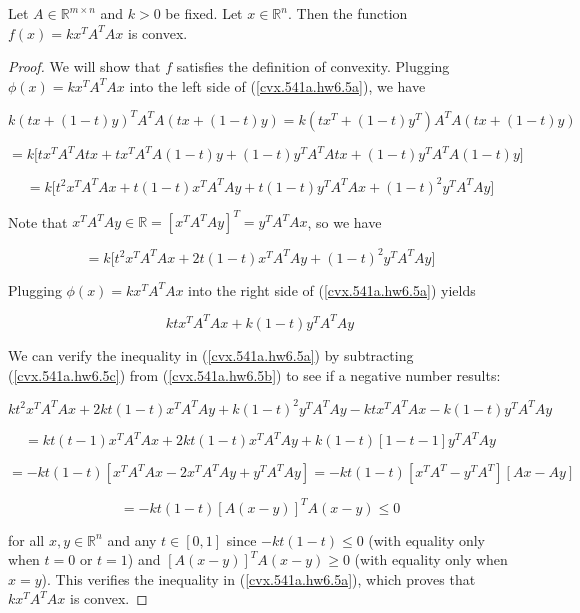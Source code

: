 \begin{proposition}\label{cvs.quad.form.cvx} Let $A \in \mathbb{R}^{m \times n}$ and \(k > 0\) be fixed. Let \(x \in \mathbb{R}^n\). Then the function  \( f(x) = k x^TA^TAx\) is convex.

\end{proposition}

\begin{proof}

We will show that \(f\) satisfies the definition of convexity. Plugging \( \phi(x) = k x^TA^TAx\) into the left side of (\ref{cvx.541a.hw6.5a}), we have

\[
k(tx+(1-t)y)^T A^TA(tx+(1-t)y)  = k(tx^T+(1-t)y^T) A^TA(tx+(1-t)y) 
\]

\[
= k \big[ tx^T A^TA tx + tx^T A^TA  (1-t)y +   (1-t)y^T A^TAtx + (1-t)y^T A^TA(1-t)y  \big]
\]

\[
= k \big[ t^2x^T A^TA x + t(1-t)x^T A^TA  y +   t(1-t)y^T A^TAx + (1-t)^2y^T A^TAy  \big]
\]

Note that \(x^T A^TA  y \in \mathbb{R} = [x^T A^TA  y ]^T = y^T A^TAx\), so we have

\begin{equation}\label{cvx.541a.hw6.5b}
= k \big[ t^2x^T A^TA x + 2t(1-t)x^T A^TA  y  + (1-t)^2y^T A^TAy  \big]
\end{equation}

Plugging \( \phi(x) = k x^TA^TAx\) into the right side of (\ref{cvx.541a.hw6.5a}) yields

\begin{equation}\label{cvx.541a.hw6.5c}
 k t  x^TA^TAx +k(1-t)  y^TA^TAy
\end{equation}

We can verify the inequality in (\ref{cvx.541a.hw6.5a}) by subtracting (\ref{cvx.541a.hw6.5c}) from (\ref{cvx.541a.hw6.5b}) to see if a negative number results:

\[
 k  t^2x^T A^TA x +2k t(1-t)x^T A^TA  y  + k  (1-t)^2y^T A^TAy -k  t  x^TA^TAx - k (1-t) y^TA^TAy
\]

\[
= k t (t - 1) x^T A^TA x   +2k t(1-t)x^T A^TA  y  + k (1-t) [1-t - 1] y^T A^TAy
\]

\[
= -k t (1 - t) [x^T A^TA x - 2x^T A^TA  y +  y^T A^TAy]  = -k t (1 - t) [x^T A^T - y^T A^T ] [Ax - Ay ]
\]

\[
  = -k t (1 - t) [A(x-y) ]^T A(x-y)  \leq 0
\]

for all \(x, y \in \mathbb{R}^n\) and any \(t \in [0,1]\) since \( -k t (1 - t)  \leq 0\) (with equality only when \(t = 0\) or \(t= 1\)) and \( [A(x-y) ]^T A(x-y)  \geq 0\) (with equality only when \(x= y\)). This verifies the inequality in (\ref{cvx.541a.hw6.5a}), which proves that \( k x^TA^TAx\) is convex.

\end{proof}

